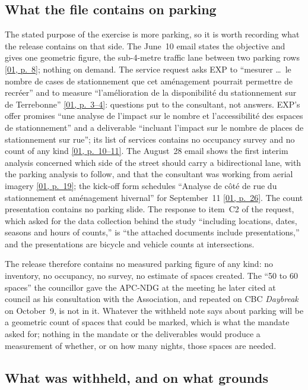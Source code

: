 \documentclass[11pt,letterpaper]{article}
\newcommand{\pagesurl}{https://openmobilitydata.github.io/Terrebonne-access-requests}
\newcommand{\pgl}[3]{\href{\pagesurl/\csname bundle#1\endcsname\#page=#2}{\textsf{\small[#1, p.~#3]}}}
\newcommand{\pg}[2]{\pgl{#1}{#2}{#2}}
\begin{document}
\subsection{What the file contains on parking}

The stated purpose of the exercise is more parking, so it is worth
recording what the release contains on that side. The June~10 email states
the objective and gives one geometric figure, the sub-4-metre traffic lane
between two parking rows \pg{01}{8}; nothing on demand. The service request
asks EXP to ``mesurer \ldots\ le nombre de cases de stationnement que cet
am\'enagement pourrait permettre de recr\'eer'' and to measure
``l'am\'elioration de la disponibilit\'e du stationnement sur de
Terrebonne'' \pgl{01}{3}{3--4}: questions put to the consultant, not
answers. EXP's offer promises ``une analyse de l'impact sur le nombre et
l'accessibilit\'e des espaces de stationnement'' and a deliverable
``incluant l'impact sur le nombre de places de stationnement sur rue''; its
list of services contains no occupancy survey and no count of any kind
\pgl{01}{10}{10--11}. The August~28 email shows the first interim analysis
concerned which side of the street should carry a bidirectional lane, with
the parking analysis to follow, and that the consultant was working from
aerial imagery \pg{01}{19}; the kick-off form schedules ``Analyse de c\^ot\'e
de rue du stationnement et am\'enagement hivernal'' for September~11
\pg{01}{26}. The count presentation contains no parking slide. The
response to item~C2 of the request, which asked for the data collection
behind the study ``including locations, dates, seasons and hours of
counts,'' is ``the attached documents include presentations,'' and the
presentations are bicycle and vehicle counts at intersections.

The release therefore contains no measured parking figure of any kind: no
inventory, no occupancy, no survey, no estimate of spaces created. The
``50 to 60 spaces'' the councillor gave the APC-NDG at the meeting he
later cited at council as his consultation with the Association, and
repeated on CBC \emph{Daybreak} on October~9, is not in it. Whatever the
withheld note says about parking will be a geometric count of spaces that
could be marked, which is what the mandate asked for; nothing in the mandate
or the deliverables would produce a measurement of whether, or on how many
nights, those spaces are needed.

\subsection{What was withheld, and on what grounds}
\end{document}
